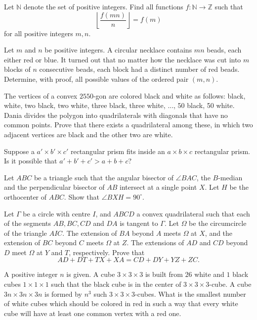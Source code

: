 \documentclass[11pt]{scrartcl}
\begin{document}
\begin{problem}[5901329049595563801]
Let $\mathbb{N}$ denote the set of positive integers. Find all functions $f \colon \mathbb{N} \to \mathbb{Z}$ such that\[\left\lfloor \frac{f(mn)}{n} \right\rfloor=f(m)\]for all positive integers $m,n$.
\end{problem}
\begin{problem}[811235233671414145]
Let $m$ and $n$ be positive integers. A circular necklace contains $mn$ beads, each either red or blue. It turned out that no matter how the necklace was cut into $m$ blocks of $n$ consecutive beads, each block had a distinct number of red beads. Determine, with proof, all possible values of the ordered pair $(m, n)$.
\end{problem}
\begin{problem}[5395714337110519657]
The vertices of a convex $2550$-gon are colored black and white as follows: black, white, two black, two white, three black, three white, ..., 50 black, 50 white. Dania divides the polygon into quadrilaterals with diagonals that have no common points. Prove that there exists a quadrilateral among these, in which two adjacent vertices are black and the other two are white.
\end{problem}
\begin{problem}[260804315613681]
  Suppose a $a' \times b' \times c'$ rectangular prism fits
  inside an $a \times b \times c$ rectangular prism.
  Is it possible that $a' + b' + c' > a + b + c$?
\end{problem}
\begin{problem}[264456837378391]
Let $ABC$ be a triangle such that the angular bisector of $\angle BAC$, the $B$-median and the perpendicular bisector of $AB$ intersect at a single point $X$. Let $H$ be the orthocenter of $ABC$. Show that $\angle BXH = 90^{\circ}$.
\end{problem}
\begin{problem}[240654526717277]
Let $\Gamma$ be a circle with centre $I$, and $A B C D$ a convex quadrilateral such that each of the segments $A B, B C, C D$ and $D A$ is tangent to $\Gamma$. Let $\Omega$ be the circumcircle of the triangle $A I C$. The extension of $B A$ beyond $A$ meets $\Omega$ at $X$, and the extension of $B C$ beyond $C$ meets $\Omega$ at $Z$. The extensions of $A D$ and $C D$ beyond $D$ meet $\Omega$ at $Y$ and $T$, respectively. Prove that\[A D+D T+T X+X A=C D+D Y+Y Z+Z C.\]
\end{problem}
\begin{problem}[457934969594281]
	A positive integer $n$ is given. A cube $3\times3\times3$ is built from $26$ white and $1$ black cubes $1\times1\times1$ such that the black cube is in the center of $3\times3\times3$-cube. A cube $3n\times 3n\times 3n$ is formed by $n^3$ such $3\times3\times3$-cubes. What is the smallest number of white cubes which should be colored in red in such a way that every white cube will have at least one common vertex with a red one.
\end{problem}
\end{document}
